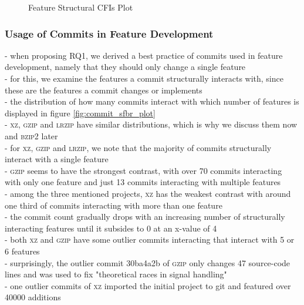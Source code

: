 \clearpage

\begin{figure}[htbp]
  \centering
  
  \caption{Feature Structural CFIs Plot}
  \label{fig:feature_sfbr_plot}
\end{figure}

\clearpage

\subsubsection*{Usage of Commits in Feature Development}\label{sec:eval_commit_usage}

- when proposing RQ1, we derived a best practice of commits used in feature development, namely that they should only change a single feature \\
- for this, we examine the features a commit structurally interacts with, since these are the features a commit changes or implements \\
- the distribution of how many commits interact with which number of features is displayed in figure \ref{fig:commit_sfbr_plot} \\
- \textsc{xz}, \textsc{gzip} and \textsc{lrzip} have similar distributions, which is why we discuss them now and \textsc{bzip2} later \\
- for \textsc{xz}, \textsc{gzip} and \textsc{lrzip}, we note that the majority of commits structurally interact with a single feature \\
- \textsc{gzip} seems to have the strongest contrast, with over 70 commits interacting with only one feature and just 13 commits interacting with multiple features \\
- among the three mentioned projects, \textsc{xz} has the weakest contrast with around one third of commits interacting with more than one feature \\
- the commit count gradually drops with an increasing number of structurally interacting features until it subsides to 0 at an x-value of 4 \\
- both \textsc{xz} and \textsc{gzip} have some outlier commits interacting that interact with 5 or 6 features \\
- surprisingly, the outlier commit \textsf{30ba4a2b} of \textsc{gzip} only changes 47 source-code lines and was used to fix "theoretical races in signal handling" \\
- one outlier commits of \textsc{xz} imported the initial project to git and featured over 40000 additions \\
